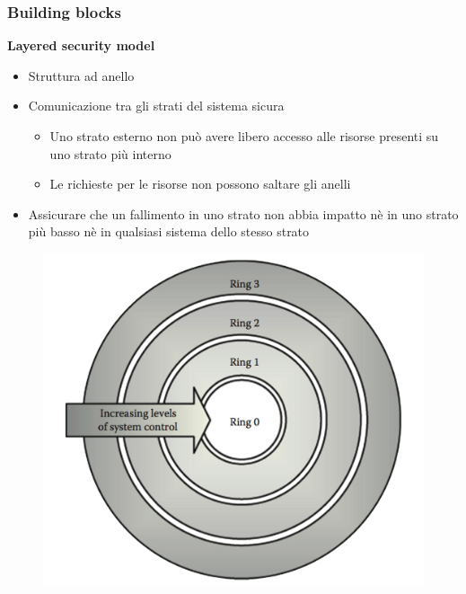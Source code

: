 \begin{frame}
  \frametitle{Building blocks}
  \textbf{Layered security model}
  \begin{itemize}
  \item Struttura ad anello 
  \item Comunicazione tra gli strati del sistema sicura
	  \begin{itemize}
  	\item Uno strato esterno non può avere libero accesso alle risorse presenti su uno strato più interno
  	\item Le richieste per le risorse non possono saltare gli anelli
  	\end{itemize}
  \item Assicurare che un fallimento in uno strato non abbia impatto nè in uno strato più basso nè in qualsiasi sistema dello stesso strato
  \end{itemize}
    	\begin{figure}[h] 
		\includegraphics[scale=0.1]{imgs/ring.png}
	\end{figure}
\end{frame}


